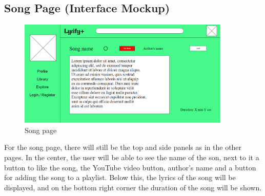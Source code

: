 \subsection{Song Page (Interface Mockup)}

\begin{figure}[h!]
\centering
\includegraphics[width=0.9\textwidth]{sections/PLL/SongPageMockup.png}
\caption{Song page}
\end{figure}

For the song page, there will still be the top and side panels as in the other pages. In the center, the user will be able to see the name of the son, next to it a button to like the song, the YouTube video button, author’s name and a button for adding the song to a playlist. Below this, the lyrics of the song will be displayed, and on the bottom right corner the duration of the song will be shown.